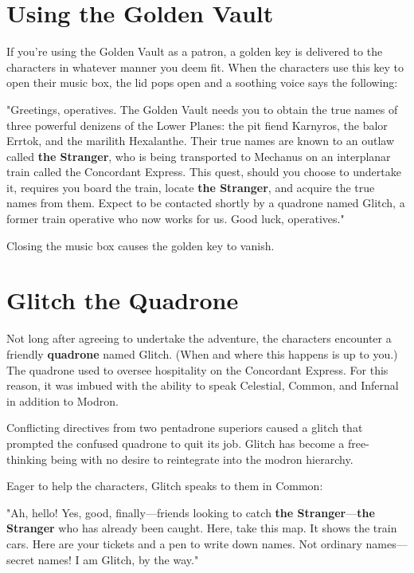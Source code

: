 \documentclass[10pt,a4paper,twoside,bg=print,twocolumn,openany,nodeprecatedcode]{dndbook}
\begin{document}
\section{Using the Golden Vault}
If you're using the Golden Vault as a patron, a golden key is delivered to the characters in whatever manner you deem fit. When the characters use this key to open their music box, the lid pops open and a soothing voice says the following:

\begin{DndReadAloud}{}
"Greetings, operatives. The Golden Vault needs you to obtain the true names of three powerful denizens of the Lower Planes: the pit fiend Karnyros, the balor Errtok, and the marilith Hexalanthe. Their true names are known to an outlaw called \textbf{the Stranger}, who is being transported to Mechanus on an interplanar train called the Concordant Express. This quest, should you choose to undertake it, requires you board the train, locate \textbf{the Stranger}, and acquire the true names from them. Expect to be contacted shortly by a quadrone named Glitch, a former train operative who now works for us. Good luck, operatives."

\end{DndReadAloud}

Closing the music box causes the golden key to vanish.

\section{Glitch the Quadrone}
Not long after agreeing to undertake the adventure, the characters encounter a friendly \textbf{quadrone} named Glitch. (When and where this happens is up to you.) The quadrone used to oversee hospitality on the Concordant Express. For this reason, it was imbued with the ability to speak Celestial, Common, and Infernal in addition to Modron.

Conflicting directives from two pentadrone superiors caused a glitch that prompted the confused quadrone to quit its job. Glitch has become a free-thinking being with no desire to reintegrate into the modron hierarchy.

Eager to help the characters, Glitch speaks to them in Common:

\begin{DndReadAloud}{}
"Ah, hello! Yes, good, finally—friends looking to catch \textbf{the Stranger}—\textbf{the Stranger} who has already been caught. Here, take this map. It shows the train cars. Here are your tickets and a pen to write down names. Not ordinary names—secret names! I am Glitch, by the way."

\end{DndReadAloud}
\end{document}
